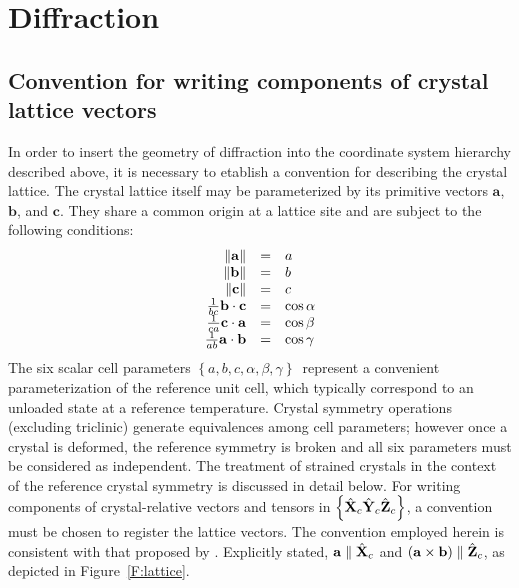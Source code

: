 \documentclass[12pt,letterpaper,final]{amsart}
\newcommand{\mbm}[1]{\ensuremath{\mbox{\boldmath$#1$}}}
\newcommand{\Xc}{\ensuremath{\hat{\mbm{\mathrm{X}}}_c}}
\newcommand{\Yc}{\ensuremath{\hat{\mbm{\mathrm{Y}}}_c}}
\newcommand{\Zc}{\ensuremath{\hat{\mbm{\mathrm{Z}}}_c}}
\newcommand{\xtlframe}{\ensuremath{\left\{\Xc\Yc\Zc\right\}}}
\newcommand{\figref}[1]{Figure~\ref{#1}}
\newcommand{\cella}{\ensuremath{\mathbf{a}}}
\newcommand{\cellb}{\ensuremath{\mathbf{b}}}
\newcommand{\cellc}{\ensuremath{\mathbf{c}}}
\newcommand{\dalfa}{\ensuremath{\alpha}}
\newcommand{\dbeta}{\ensuremath{\beta}}
\newcommand{\dgama}{\ensuremath{\gamma}}
\newcommand{\cellParams}{\ensuremath{\left\{ a,b,c,\dalfa,\dbeta,\dgama \right\}}}
\newcommand{\dotp}[2]{\ensuremath{#1\cdot#2}}
\newcommand{\crossp}[2]{\ensuremath{#1\times#2}}
\begin{document}
\newpage
\section{Diffraction}\label{S:diffraction}
\subsection{Convention for writing components of crystal lattice vectors}\label{S:conventions}
In order to insert the geometry of diffraction into the coordinate system hierarchy described above, it is necessary to etablish a convention for describing the crystal lattice. The crystal lattice itself may be
parameterized by its primitive vectors \cella, \cellb, and \cellc.
They share a common origin at a lattice site and are subject to the
following conditions:
\begin{equation}
  \begin{array}{rcl}
    \|\cella\| &=& a\\
    \|\cellb\| &=& b\\
    \|\cellc\| &=& c\\
    {1 \over bc}\dotp{\cellb}{\cellc} &=& \cos\dalfa\\
    {1 \over ca}\dotp{\cellc}{\cella} &=& \cos\dbeta\\
    {1 \over ab}\dotp{\cella}{\cellb} &=& \cos\dgama
  \end{array} \label{E:lattParams}
\end{equation}
The six scalar cell parameters \cellParams\ represent a convenient parameterization of the reference unit cell, which typically correspond to an unloaded state at a reference temperature. Crystal symmetry operations (excluding triclinic) generate equivalences among cell parameters; however once a crystal is deformed, the reference symmetry is broken and all six parameters must be considered as independent.  The treatment of strained crystals in the context of the reference crystal symmetry is discussed in detail below.  For writing components of crystal-relative vectors and tensors in \xtlframe, 
a convention must be chosen to register the lattice vectors.  The
convention employed herein is consistent with that proposed by
\cite{Nye:crysBookAppB}.  Explicitly stated, $\cella\parallel\Xc$ and
$(\crossp{\cella}{\cellb})\parallel\Zc$, as depicted in
\figref{F:lattice}.
\end{document}

